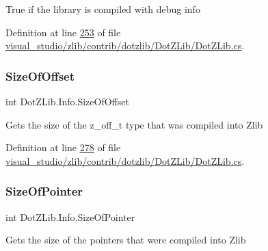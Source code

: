 True if the library is compiled with debug info 



Definition at line \hyperlink{visual__studio_2zlib_2contrib_2dotzlib_2_dot_z_lib_2_dot_z_lib_8cs_source_l00253}{253} of file \hyperlink{visual__studio_2zlib_2contrib_2dotzlib_2_dot_z_lib_2_dot_z_lib_8cs_source}{visual\+\_\+studio/zlib/contrib/dotzlib/\+Dot\+Z\+Lib/\+Dot\+Z\+Lib.\+cs}.

\mbox{\label{class_dot_z_lib_1_1_info_ad1ea695cbf9012e1b458f0a754dcfe7f}} 
\subsubsection{\texorpdfstring{Size\+Of\+Offset}{SizeOfOffset}}
{\footnotesize\ttfamily int Dot\+Z\+Lib.\+Info.\+Size\+Of\+Offset\hspace{0.3cm}{\ttfamily [get]}}



Gets the size of the z\+\_\+off\+\_\+t type that was compiled into Zlib 



Definition at line \hyperlink{visual__studio_2zlib_2contrib_2dotzlib_2_dot_z_lib_2_dot_z_lib_8cs_source_l00278}{278} of file \hyperlink{visual__studio_2zlib_2contrib_2dotzlib_2_dot_z_lib_2_dot_z_lib_8cs_source}{visual\+\_\+studio/zlib/contrib/dotzlib/\+Dot\+Z\+Lib/\+Dot\+Z\+Lib.\+cs}.

\mbox{\label{class_dot_z_lib_1_1_info_a18ba70edb75d11f7a09d4ae4742f3c2f}} 
\subsubsection{\texorpdfstring{Size\+Of\+Pointer}{SizeOfPointer}}
{\footnotesize\ttfamily int Dot\+Z\+Lib.\+Info.\+Size\+Of\+Pointer\hspace{0.3cm}{\ttfamily [get]}}



Gets the size of the pointers that were compiled into Zlib 



